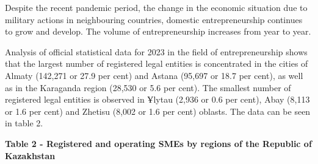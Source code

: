 Despite the recent pandemic period, the change in the economic situation
due to military actions in neighbouring countries, domestic
entrepreneurship continues to grow and develop. The volume of
entrepreneurship increases from year to year.

Analysis of official statistical data for 2023 in the field of
entrepreneurship shows that the largest number of registered legal
entities is concentrated in the cities of Almaty (142,271 or 27.9 per
cent) and Astana (95,697 or 18.7 per cent), as well as in the Karaganda
region (28,530 or 5.6 per cent). The smallest number of registered legal
entities is observed in Ұlytau (2,936 or 0.6 per cent), Abay (8,113 or
1.6 per cent) and Zhetisu (8,002 or 1.6 per cent) oblasts. The data can
be seen in table 2.

{\bfseries Table 2 - Registered and operating SMEs by regions of the
Republic of Kazakhstan}

